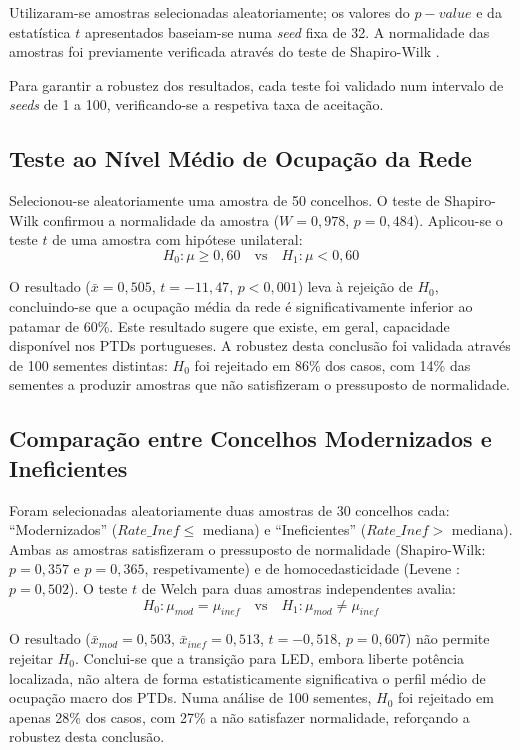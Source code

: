 \documentclass[conference]{IEEEtran}
\begin{document}
Utilizaram-se amostras selecionadas aleatoriamente; os valores do $p-value$ e da estatística $t$ apresentados baseiam-se numa \textit{seed} fixa de 32. A normalidade das amostras foi previamente verificada através do teste de Shapiro-Wilk \cite{b8}. 

Para garantir a robustez dos resultados, cada teste foi validado num intervalo de \textit{seeds} de 1 a 100, verificando-se a respetiva taxa de aceitação.

\subsection{Teste ao Nível Médio de Ocupação da Rede}

Selecionou-se aleatoriamente uma amostra de 50 concelhos. O teste de Shapiro-Wilk confirmou a normalidade da amostra ($W = 0{,}978$, $p = 0{,}484$). Aplicou-se o teste $t$ de uma amostra com hipótese unilateral:
\begin{equation}
H_0: \mu \geq 0{,}60 \quad \text{vs} \quad H_1: \mu < 0{,}60
\end{equation}

O resultado ($\bar{x} = 0{,}505$, $t = -11{,}47$, $p < 0{,}001$) leva à rejeição de $H_0$, concluindo-se que a ocupação média da rede é significativamente inferior ao patamar de 60\%. Este resultado sugere que existe, em geral, capacidade disponível nos PTDs portugueses. A robustez desta conclusão foi validada através de 100 sementes distintas: $H_0$ foi rejeitado em 86\% dos casos, com 14\% das sementes a produzir amostras que não satisfizeram o pressuposto de normalidade.

\subsection{Comparação entre Concelhos Modernizados e Ineficientes}

Foram selecionadas aleatoriamente duas amostras de 30 concelhos cada: ``Modernizados'' ($Rate\_Inef \leq$ mediana) e ``Ineficientes'' ($Rate\_Inef >$ mediana). Ambas as amostras satisfizeram o pressuposto de normalidade (Shapiro-Wilk: $p = 0{,}357$ e $p = 0{,}365$, respetivamente) e de homocedasticidade (Levene \cite{b14}: $p = 0{,}502$). O teste $t$ de Welch para duas amostras independentes avalia:
\begin{equation}
H_0: \mu_{mod} = \mu_{inef} \quad \text{vs} \quad H_1: \mu_{mod} \neq \mu_{inef}
\end{equation}

O resultado ($\bar{x}_{mod} = 0{,}503$, $\bar{x}_{inef} = 0{,}513$, $t = -0{,}518$, $p = 0{,}607$) não permite rejeitar $H_0$. Conclui-se que a transição para LED, embora liberte potência localizada, não altera de forma estatisticamente significativa o perfil médio de ocupação macro dos PTDs. Numa análise de 100 sementes, $H_0$ foi rejeitado em apenas 28\% dos casos, com 27\% a não satisfazer normalidade, reforçando a robustez desta conclusão.
\end{document}
